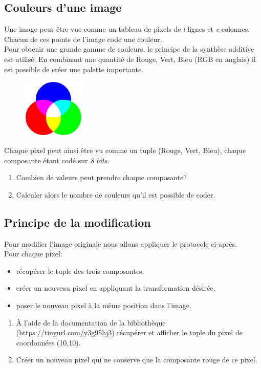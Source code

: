 \documentclass[a4paper,11pt]{article}
\begin{document}
\begin{Form}
\subsection{Couleurs d'une image}
Une image peut être vue comme un tableau de pixels de \emph{l} lignes et \emph{c} colonnes. Chacun de ces points de l'image code une couleur.\\
Pour obtenir une grande gamme de couleurs, le principe de la synthèse additive est utilisé. En combinant une quantité de Rouge, Vert, Bleu (RGB en anglais) il est possible de créer une palette importante. 
\begin{figure}[!h]
\centering
\includegraphics[width=3cm]{ressources/additive.jpg}
\label{additive}
\end{figure}

Chaque pixel peut ainsi être vu comme un tuple (Rouge, Vert, Bleu), chaque composante étant codé sur \emph{8 bits}.
\begin{activite}
\begin{enumerate}
\item Combien de valeurs peut prendre chaque composante?
\item Calculer alors le nombre de couleurs qu'il est possible de coder.
\end{enumerate}
\end{activite}
\subsection{Principe de la modification}
Pour modifier l'image originale nous allons appliquer le protocole ci-après.\\
Pour chaque pixel:
\begin{itemize}
\item récupérer le tuple des trois composantes,
\item créer un nouveau pixel en appliquant la transformation désirée,
\item poser le nouveau pixel à la même position dans l'image.
\end{itemize}
\begin{activite}
\begin{enumerate}
\item À l'aide de la documentation de la bibliothèque (\url{https://tinyurl.com/y3g95hj3}) récupérer et afficher le tuple du pixel de coordonnées (10,10).
\item Créer un nouveau pixel qui ne conserve que la composante rouge de ce pixel.
\end{enumerate}
\end{activite}

\end{Form}
\end{document}
